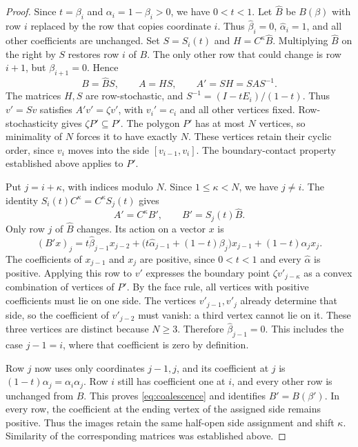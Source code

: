 \documentclass[11pt,a4paper]{article}
\theoremstyle{definition}
\theoremstyle{remark}
\numberwithin{equation}{section}
\begin{document}
\begin{proof}
Since $t=\beta_i$ and $\alpha_i=1-\beta_i>0$, we have $0<t<1$. Let $\widehat B$ be $B(\beta)$ with row $i$ replaced by the row that copies coordinate $i$. Thus $\widehat\beta_i=0$, $\widehat\alpha_i=1$, and all other coefficients are unchanged. Set $S=S_i(t)$ and $H=C^\kappa\widehat B$. Multiplying $\widehat B$ on the right by $S$ restores row $i$ of $B$. The only other row that could change is row $i+1$, but $\beta_{i+1}=0$. Hence
\[
 B=\widehat B S,\qquad A=HS,\qquad A'=SH=SAS^{-1}.
\]
The matrices $H,S$ are row-stochastic, and $S^{-1}=(I-tE_i)/(1-t)$. Thus $v'=Sv$ satisfies $A'v'=\zeta v'$, with $v_i'=c_i$ and all other vertices fixed. Row-stochasticity gives $\zeta P'\subseteq P'$. The polygon $P'$ has at most $N$ vertices, so minimality of $N$ forces it to have exactly $N$. These vertices retain their cyclic order, since $v_i$ moves into the side $[v_{i-1},v_i]$. The boundary-contact property established above applies to $P'$.

Put $j=i+\kappa$, with indices modulo $N$. Since $1\le\kappa<N$, we have $j\ne i$. The identity $S_i(t)C^\kappa=C^\kappa S_j(t)$ gives
\[
 A'=C^\kappa B',\qquad B'=S_j(t)\widehat B.
\]
Only row $j$ of $\widehat B$ changes. Its action on a vector $x$ is
\[
 (B'x)_j=t\widehat\beta_{j-1}x_{j-2}
 +\bigl(t\widehat\alpha_{j-1}+(1-t)\beta_j\bigr)x_{j-1}
 +(1-t)\alpha_j x_j.
\]
The coefficients of $x_{j-1}$ and $x_j$ are positive, since $0<t<1$ and every $\widehat\alpha$ is positive. Applying this row to $v'$ expresses the boundary point $\zeta v'_{j-\kappa}$ as a convex combination of vertices of $P'$. By the face rule, all vertices with positive coefficients must lie on one side. The vertices $v'_{j-1},v'_j$ already determine that side, so the coefficient of $v'_{j-2}$ must vanish: a third vertex cannot lie on it. These three vertices are distinct because $N\ge3$. Therefore $\widehat\beta_{j-1}=0$. This includes the case $j-1=i$, where that coefficient is zero by definition.

Row $j$ now uses only coordinates $j-1,j$, and its coefficient at $j$ is $(1-t)\alpha_j=\alpha_i\alpha_j$. Row $i$ still has coefficient one at $i$, and every other row is unchanged from $B$. This proves \eqref{eq:coalescence} and identifies $B'=B(\beta')$. In every row, the coefficient at the ending vertex of the assigned side remains positive. Thus the images retain the same half-open side assignment and shift $\kappa$. Similarity of the corresponding matrices was established above.
\end{proof}
\end{document}
